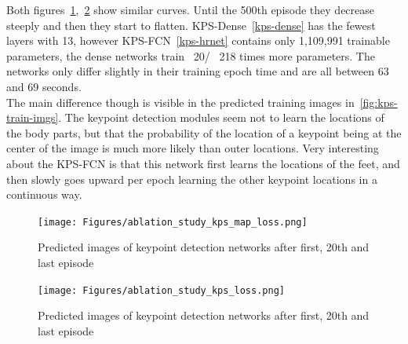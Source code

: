 Both figures~\ref{fig:kps-map-loss},~\ref{fig:kps-loss} show similar curves.
Until the 500th episode they decrease steeply and then they start to flatten.
KPS-Dense~\ref{kps-dense} has the fewest layers with 13, however KPS-FCN~\ref{kps-hrnet} contains only 1,109,991
trainable parameters, the dense networks train ~20/ ~218 times more parameters.
The networks only differ slightly in their training epoch time and are all between 63 and 69 seconds.\\
The main difference though is visible in the predicted training images in~\ref{fig:kps-train-imgs}.
The keypoint detection modules seem not to learn the locations of the body parts, but that the probability of the location
of a keypoint being at the center of the image is much more likely than outer locations.
Very interesting about the KPS-FCN is that this network first learns the locations of the feet, and then slowly goes
upward per epoch learning the other keypoint locations in a continuous way.


\begin{figure}[H]
    \centering
    \texttt{[image: Figures/ablation\_study\_kps\_map\_loss.png]}
    \decoRule
    \caption[Ablation Keypoints Detection Module: Predicted Training Images]{Predicted images of keypoint detection networks
    after first, 20th and last episode}
    \label{fig:kps-map-loss}
\end{figure}


\begin{figure}[H]
    \centering
    \texttt{[image: Figures/ablation\_study\_kps\_loss.png]}
    \decoRule
    \caption[Ablation Keypoints Detection Module: Predicted Training Images]{Predicted images of keypoint detection networks
    after first, 20th and last episode}
    \label{fig:kps-loss}
\end{figure}

